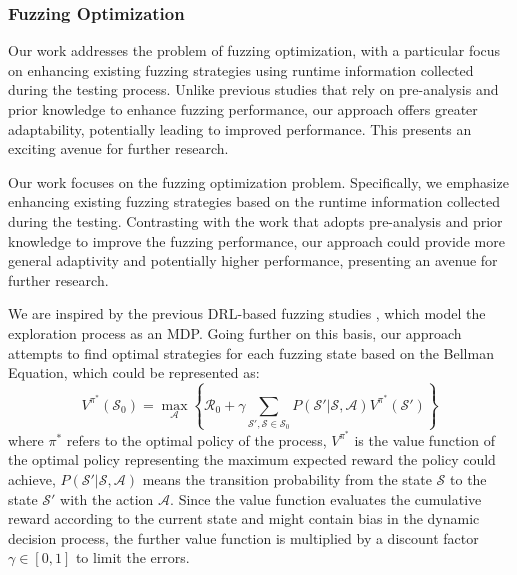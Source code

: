 \documentclass[lettersize,journal]{IEEEtran}
\begin{document}
\subsubsection{Fuzzing Optimization}
Our work addresses the problem of fuzzing optimization, with a particular focus on enhancing existing fuzzing strategies using runtime information collected during the testing process. Unlike previous studies that rely on pre-analysis and prior knowledge to enhance fuzzing performance, our approach offers greater adaptability, potentially leading to improved performance. This presents an exciting avenue for further research.

Our work focuses on the fuzzing optimization problem. Specifically, we emphasize enhancing existing fuzzing strategies based on the runtime information collected during the testing. Contrasting with the work that adopts pre-analysis and prior knowledge to improve the fuzzing performance, our approach could provide more general adaptivity and potentially higher performance, presenting an avenue for further research.

We are inspired by the previous DRL-based fuzzing studies \cite{bottingerDeepReinforcementFuzzing2018,binosiRainfuzzReinforcementlearningDriven2023,liangRLFDirectedFuzzing2022}, which model the exploration process as an MDP. Going further on this basis, our approach attempts to find optimal strategies for each fuzzing state based on the Bellman Equation, which could be represented as:
\begin{equation}
	V^{\pi^*}(\mathcal{S}_0) = \max_{\mathcal{A}}\left\{\mathcal{R}_0 + \gamma \sum_{\mathcal{S}', \mathcal{S}\in \mathcal{S}_0}P(\mathcal{S}'|\mathcal{S},\mathcal{A})V^{\pi^*}(\mathcal{S}')\right\}
\end{equation}
where $\pi^*$ refers to the optimal policy of the process, $V^{\pi^*}$ is the value function of the optimal policy representing the maximum expected reward the policy could achieve, $P(\mathcal{S}'|\mathcal{S}, \mathcal{A})$ means the transition probability from the state $\mathcal{S}$ to the state $\mathcal{S}'$ with the action $\mathcal{A}$. Since the value function evaluates the cumulative reward according to the current state and might contain bias in the dynamic decision process, the further value function is multiplied by a discount factor $\gamma \in [0, 1]$ to limit the errors.
\end{document}
